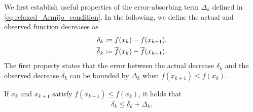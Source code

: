 \documentclass[journal_revised_MPC]{subfiles}
\begin{document}
We first establish useful properties of the error-absorbing term $\Delta_k$ defined in \cref{eq:relaxed_Armijo_condition}.
In the following, we define the actual and observed function decreases as
\begin{align}
    \delta_k            & \coloneqq f(x_k) - f(x_{k+1}),           \label{eq:def_small_delta_k}                      \\
    \overline{\delta}_k & \coloneqq \overline{f}(x_k) - \overline{f}(x_{k+1}). \label{eq:def_overline_small_delta_k}
\end{align}
The first property states that the error between the actual decrease $\delta_k$ and the observed decrease $\overline{\delta}_k$ can be bounded by $\Delta_k$ when $f(x_{k+1}) \le f(x_k)$.
\begin{lemma}\label{lem:error_bound_on_function_evaluations}
    If $x_k$ and $x_{k+1}$ satisfy $f(x_{k+1}) \le f(x_k)$, it holds that
    \begin{equation*}
        \delta_k \leq \overline{\delta}_k + \Delta_k.
    \end{equation*}
\end{lemma}
\end{document}
